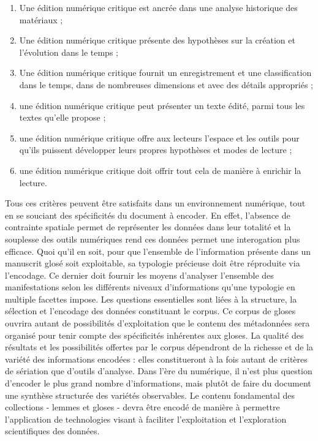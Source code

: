 \documentclass[a4paper, twoside, 12pt]{book}
\begin{document}
\begin{enumerate}
  \item Une édition numérique critique est ancrée dans une analyse historique des matériaux ;
  \item Une édition numérique critique présente des hypothèses sur la création et l’évolution dans le temps ;
  \item Une édition numérique critique fournit un enregistrement et une classification dans le temps, dans de nombreuses dimensions et avec des détails appropriés ;
  \item une édition numérique critique peut présenter un texte édité, parmi tous les textes qu'elle propose ;
  \item une édition numérique critique offre aux lecteurs l’espace et les outils pour qu’ils puissent développer leurs propres hypothèses et modes de lecture ;
  \item une édition numérique critique doit offrir tout cela de manière à enrichir la lecture.
\end{enumerate}

Tous ces critères peuvent être satisfaits dans un environnement numérique, tout en se souciant des spécificités du document à encoder. En effet, l’absence de contrainte spatiale permet de représenter les données dans leur totalité et la souplesse des outils numériques rend ces données permet une interogation plus efficace. Quoi qu'il en soit, pour que l'ensemble de l'information présente dans un manuscrit glosé soit exploitable, sa typologie précieuse doit être réproduite via l'encodage. Ce dernier doit fournir les moyens d’analyser l’ensemble des manifestations selon les différents niveaux d’informations qu'une typologie en \og{} multiple facettes \fg{} impose. Les questions essentielles sont liées à la structure, la sélection et l'encodage des données constituant le corpus. Ce corpus de gloses ouvrira autant de possibilités d'exploitation que le contenu des métadonnées sera organisé pour tenir compte des spécificités inhérentes aux gloses. La qualité des résultats et les possibilités offertes par le corpus dépendront de la richesse et de la variété des informations encodées : elles constitueront à la fois autant de critères de sériation que d'outils d'analyse. Dans l'ère du numérique, il n'est plus question d'encoder le plus grand nombre d'informations, mais plutôt de faire du document \og{} une synthèse structurée des variétés observables\og{}. Le contenu fondamental des collections - lemmes et gloses - devra être encodé de manière à permettre l'application de technologies visant à faciliter l'exploitation et l'exploration scientifiques des données. 
\end{document}
